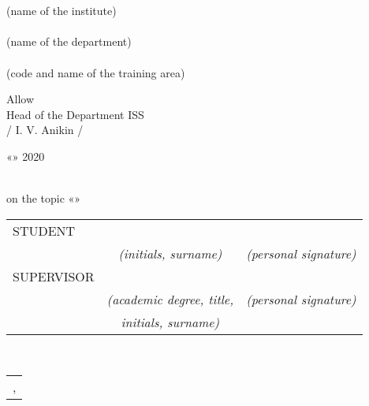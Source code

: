 \emergencystretch=25pt
\begin{titlepage}
	\begin{center}

		\normalsize{\universityeng}\\
		
		\hfill \break
		\underline{\normalsize{\instituteeng}}\\
		\small{(name of the institute)}\\
		\underline{\normalsize{\departmenteng}}\\
		\small{(name of the department)}\\
		
		\hfill\break
		\normalsize{\studieseng}\\
		\small{(code and name of the training area)}
	\end{center}
	\par\smallskip
	\begin{flushright}
		\normalsize{Allow}
		\\ \normalsize{Head of the Department ISS}
		\\ \normalsize{\underline{\hspace{1.2in}} / I. V. Anikin /}
		\\
		\rule{0cm}{1cm} \normalsize{«\underline{\hspace{0.45in}}» \underline{\hspace{1.2in}} 2020}
	\end{flushright}
	
	\par\smallskip
	
	\begin{center}
		\large{\thesistypeeng\\
			\large{on the topic «\thesistitleeng»}}\\
		\hfill \break
	\end{center}
	\normalsize{
		\begin{tabular}{lcr}
			STUDENT & \underline{\authorNameeng} &  \underline{\hspace{2.7in}}\\
			& \small\textit{(initials, surname)} & \small\textit{(personal signature)}\\
			SUPERVISOR & \underline{\tutoreng} &  \underline{\hspace{2.7in}}\\
			& \small\textit{(academic degree, title,} & \small\textit{(personal signature)}\\
			& \small\textit{initials, surname)}&
		\end{tabular}
	}\\
	
	\begin{table}[b!]
		\centering
		\begin{tabular}{c}
			\locationeng,  \submissiondateeng
		\end{tabular}
	\end{table}
	
	\thispagestyle{empty} %
	
\end{titlepage}
